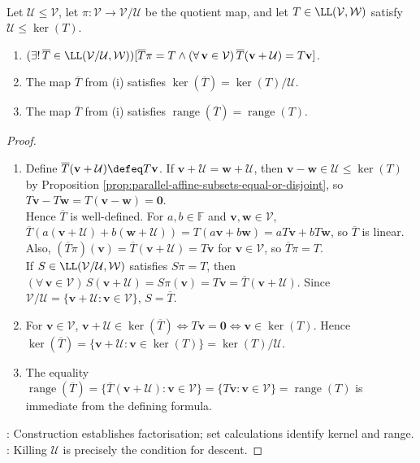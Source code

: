 \begin{theorem} \label{thm:quotient-universal-property} \\
Let $\mathcal{U}\leq\mathcal{V}$, let $\pi:\mathcal{V}\to\mathcal{V}/\mathcal{U}$ be the quotient map, and let $T\in\LL(\mathcal{V},\mathcal{W})$ satisfy $\mathcal{U}\leq\ker(T)$.
\begin{enumerate}[label=(\roman*)]
\setlength{\itemsep}{0pt}
\item $(\exists!\,\overline{T}\in\LL(\mathcal{V}/\mathcal{U},\mathcal{W}))[\overline{T}\pi=T\land(\forall\,\mathbf{v}\in\mathcal{V})\,\overline{T}(\mathbf{v}+\mathcal{U})=T\mathbf{v}]$.
\item The map $\overline{T}$ from (i) satisfies $\ker(\overline{T})=\ker(T)/\mathcal{U}$.
\item The map $\overline{T}$ from (i) satisfies $\operatorname{range}(\overline{T})=\operatorname{range}(T)$.
\end{enumerate}
\begin{proof}
\begin{enumerate}[label=(\roman*)]
\setlength{\itemsep}{0pt}
\item Define $\overline{T}(\mathbf{v}+\mathcal{U})\defeq T\mathbf{v}$. If $\mathbf{v}+\mathcal{U}=\mathbf{w}+\mathcal{U}$, then $\mathbf{v}-\mathbf{w}\in\mathcal{U}\leq\ker(T)$ by Proposition \ref{prop:parallel-affine-subsets-equal-or-disjoint}, so $T\mathbf{v}-T\mathbf{w}=T(\mathbf{v}-\mathbf{w})=\mathbf{0}$.\\
Hence $\overline{T}$ is well-defined. For $a,b\in\mathbb{F}$ and $\mathbf{v},\mathbf{w}\in\mathcal{V}$, $\overline{T}(a(\mathbf{v}+\mathcal{U})+b(\mathbf{w}+\mathcal{U}))=T(a\mathbf{v}+b\mathbf{w})=aT\mathbf{v}+bT\mathbf{w}$, so $\overline{T}$ is linear.\\
Also, $(\overline{T}\pi)(\mathbf{v})=\overline{T}(\mathbf{v}+\mathcal{U})=T\mathbf{v}$ for $\mathbf{v}\in\mathcal{V}$, so $\overline{T}\pi=T$.\\
If $S\in\LL(\mathcal{V}/\mathcal{U},\mathcal{W})$ satisfies $S\pi=T$, then $(\forall\,\mathbf{v}\in\mathcal{V})\,S(\mathbf{v}+\mathcal{U})=S\pi(\mathbf{v})=T\mathbf{v}=\overline{T}(\mathbf{v}+\mathcal{U})$. Since $\mathcal{V}/\mathcal{U}=\{\mathbf{v}+\mathcal{U}:\mathbf{v}\in\mathcal{V}\}$, $S=\overline{T}$.
\item For $\mathbf{v}\in\mathcal{V}$, $\mathbf{v}+\mathcal{U}\in\ker(\overline{T})\Longleftrightarrow T\mathbf{v}=\mathbf{0}\Longleftrightarrow\mathbf{v}\in\ker(T)$. Hence $\ker(\overline{T})=\{\mathbf{v}+\mathcal{U}:\mathbf{v}\in\ker(T)\}=\ker(T)/\mathcal{U}$.
\item The equality $\operatorname{range}(\overline{T})=\{\overline{T}(\mathbf{v}+\mathcal{U}):\mathbf{v}\in\mathcal{V}\}=\{T\mathbf{v}:\mathbf{v}\in\mathcal{V}\}=\operatorname{range}(T)$ is immediate from the defining formula.
\end{enumerate}
: Construction establishes factorisation; set calculations identify kernel and range.\\
: Killing $\mathcal{U}$ is precisely the condition for descent.
\end{proof}
\end{theorem}

